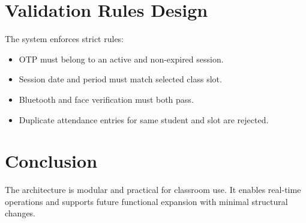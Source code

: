 \section{Validation Rules Design}
The system enforces strict rules:
\begin{itemize}
\item OTP must belong to an active and non-expired session.
\item Session date and period must match selected class slot.
\item Bluetooth and face verification must both pass.
\item Duplicate attendance entries for same student and slot are rejected.
\end{itemize}

\section{Conclusion}
The architecture is modular and practical for classroom use. It enables real-time operations and supports future functional expansion with minimal structural changes.

